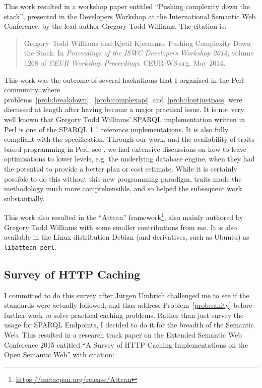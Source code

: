 This work resulted in a workshop paper entitled ``Pushing complexity
down the stack'', presented in the Developers Workshop at the
International Semantic Web Conference, by the lead author Gregory Todd
Williams. The citation is:

\begin{quote}
Gregory~Todd Williams and Kjetil Kjernsmo.
\newblock Pushing Complexity Down the Stack.
\newblock In {\em Proceedings of the ISWC Developers Workshop 2014}, volume
  1268 of {\em {CEUR} Workshop Proceedings}. CEUR-WS.org, May 2014.
\end{quote}


This work was the outcome of several hackathons that I organised in
the Perl community, where
problems~\ref{prob:breakdown},~\ref{prob:complexapi}~and~\ref{prob:dontjustpass}
were discussed at length after having become a major practical
issue. It is not very well known that Gregory Todd Williams' SPARQL
implementation written in Perl is one of the SPARQL 1.1 reference
implementations. It is also fully compliant with the
specification. Through our work, and the availability of traits-based
programming in Perl, see \cite{traits}, we had extensive discussions
on how to leave optimisations to lower levels, e.g. the underlying
database engine, when they had the potential to provide a better plan
or cost estimate. While it is certainly possible to do this without
this new programming paradigm, traits made the methodology much more
comprehensible, and so helped the subsequent work substantially.

This work also resulted in the ``Attean''
framework\footnote{\url{https://metacpan.org/release/Attean}}, also
mainly authored by Gregory Todd Williams with some smaller
contributions from me. It is also available in the Linux distribution
Debian (and derivatives, such as Ubuntu) as \texttt{libattean-perl}.

\subsection{Survey of HTTP Caching}\label{sec:consanity}

I committed to do this survey after Jürgen Umbrich challenged me to see
if the standards were actually followed, and thus address
Problem~\ref{prob:sanity} before further work to solve practical
caching problems. Rather than just survey the
usage for SPARQL Endpoints, I decided to do it for the breadth of the
Semantic Web. This resulted in a research track paper on the Extended
Semantic Web Conference 2015 entitled ``A Survey of HTTP Caching
Implementations on the Open Semantic Web'' with citation:

